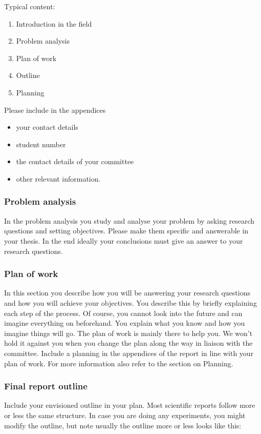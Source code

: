\documentclass{latex-format/stylesheets/BEMNextstyle}
\begin{document}
Typical content:
\begin{enumerate}
\item Introduction in the field
\item Problem analysis
\item Plan of work
\item Outline
\item Planning
\end{enumerate}

Please include in the appendices 
\begin{itemize}
\item your contact details
\item student number
\item the contact details of your committee
\item other relevant information. 
\end{itemize}

\subsubsection*{Problem analysis}
In the problem analysis you study and analyse your problem by asking research questions and setting objectives. Please make them specific and answerable in your thesis. In the end ideally your conclusions must give an answer to your research questions.

\subsubsection*{Plan of work}
In this section you describe how you will be answering your research questions and how you will achieve your objectives. You describe this by briefly explaining each step of the process. Of course, you cannot look into the future and can imagine everything on beforehand. You explain what you know and how you imagine things will go. The plan of work is mainly there to help you. We won't hold it against you when you change the plan along the way in liaison with the committee. Include a planning in the appendices of the report in line with your plan of work. For more information also refer to the section on Planning.

\subsubsection*{Final report outline}
Include your envisioned outline in your plan. Most scientific reports follow more or less the same structure. In case you are doing any experiments, you might modify the outline, but note usually the outline more or less looks like this:
\end{document}
